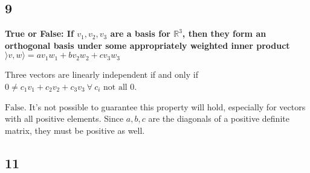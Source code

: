 \documentclass[10pt,letterpaper]{article}
\begin{document}
	\subsection*{9} \textbf{True or False: If $v_1, v_2, v_3$ are a basis for $\mathbb{R}^3$, then they form an orthogonal basis under some appropriately weighted inner product $\rangle v,w \rangle = av_1w_1 + bv_2w_2 + cv_3w_3$}
	
	Three vectors are linearly independent if and only if $0 \neq c_1v_1 + c_2 v_2 + c_3v_3 \: \forall \: c_i \text{ not all }0$. 
	
	$\boxed{\text{False}}$.  It's not possible to guarantee this property will hold, especially for vectors with all positive elements. Since $a,b,c$ are the diagonals of a positive definite matrix, they must be positive as well. 
	\subsection*{11}  
\end{document}
